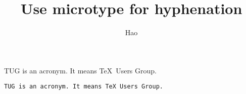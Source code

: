 \documentclass[a4paper,10pt]{article}
\title{Use microtype for hyphenation}
\author{Hao}
\begin{document}
\maketitle
\parbox{3cm}{TUG is an acronym. It means \TeX\ Users Group.}
\quad
\parbox{3cm}{\texttt{TUG is an acronym. It means \TeX\ Users Group.}}
\end{document}
